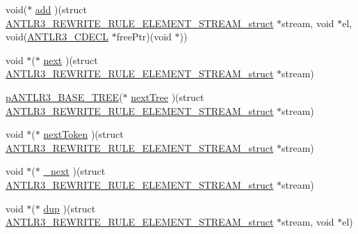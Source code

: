 \begin{DoxyCompactItemize}
\item 
void($\ast$ \hyperlink{struct_a_n_t_l_r3___r_e_w_r_i_t_e___r_u_l_e___e_l_e_m_e_n_t___s_t_r_e_a_m__struct_a40c0438d249bc834876cdeba57e5c36f}{add} )(struct \hyperlink{struct_a_n_t_l_r3___r_e_w_r_i_t_e___r_u_l_e___e_l_e_m_e_n_t___s_t_r_e_a_m__struct}{A\-N\-T\-L\-R3\-\_\-\-R\-E\-W\-R\-I\-T\-E\-\_\-\-R\-U\-L\-E\-\_\-\-E\-L\-E\-M\-E\-N\-T\-\_\-\-S\-T\-R\-E\-A\-M\-\_\-struct} $\ast$stream, void $\ast$el, void(\hyperlink{antlr3defs_8h_a91c919dd260a95cc88a0cd9b5c0a11cc}{A\-N\-T\-L\-R3\-\_\-\-C\-D\-E\-C\-L} $\ast$free\-Ptr)(void $\ast$))
\item 
void $\ast$($\ast$ \hyperlink{struct_a_n_t_l_r3___r_e_w_r_i_t_e___r_u_l_e___e_l_e_m_e_n_t___s_t_r_e_a_m__struct_a49a3d89cea69ba728843b12a5cfd51e3}{next} )(struct \hyperlink{struct_a_n_t_l_r3___r_e_w_r_i_t_e___r_u_l_e___e_l_e_m_e_n_t___s_t_r_e_a_m__struct}{A\-N\-T\-L\-R3\-\_\-\-R\-E\-W\-R\-I\-T\-E\-\_\-\-R\-U\-L\-E\-\_\-\-E\-L\-E\-M\-E\-N\-T\-\_\-\-S\-T\-R\-E\-A\-M\-\_\-struct} $\ast$stream)
\item 
\hyperlink{antlr3interfaces_8h_a6313a8a3e8f044398a393bd10c083852}{p\-A\-N\-T\-L\-R3\-\_\-\-B\-A\-S\-E\-\_\-\-T\-R\-E\-E}($\ast$ \hyperlink{struct_a_n_t_l_r3___r_e_w_r_i_t_e___r_u_l_e___e_l_e_m_e_n_t___s_t_r_e_a_m__struct_acb290228de319c4cf0a219a0a413069b}{next\-Tree} )(struct \hyperlink{struct_a_n_t_l_r3___r_e_w_r_i_t_e___r_u_l_e___e_l_e_m_e_n_t___s_t_r_e_a_m__struct}{A\-N\-T\-L\-R3\-\_\-\-R\-E\-W\-R\-I\-T\-E\-\_\-\-R\-U\-L\-E\-\_\-\-E\-L\-E\-M\-E\-N\-T\-\_\-\-S\-T\-R\-E\-A\-M\-\_\-struct} $\ast$stream)
\item 
void $\ast$($\ast$ \hyperlink{struct_a_n_t_l_r3___r_e_w_r_i_t_e___r_u_l_e___e_l_e_m_e_n_t___s_t_r_e_a_m__struct_ae68722ecc1e063575e357f87959f23a7}{next\-Token} )(struct \hyperlink{struct_a_n_t_l_r3___r_e_w_r_i_t_e___r_u_l_e___e_l_e_m_e_n_t___s_t_r_e_a_m__struct}{A\-N\-T\-L\-R3\-\_\-\-R\-E\-W\-R\-I\-T\-E\-\_\-\-R\-U\-L\-E\-\_\-\-E\-L\-E\-M\-E\-N\-T\-\_\-\-S\-T\-R\-E\-A\-M\-\_\-struct} $\ast$stream)
\item 
void $\ast$($\ast$ \hyperlink{struct_a_n_t_l_r3___r_e_w_r_i_t_e___r_u_l_e___e_l_e_m_e_n_t___s_t_r_e_a_m__struct_a69cee716e8e1deb6aa763737c5181544}{\-\_\-next} )(struct \hyperlink{struct_a_n_t_l_r3___r_e_w_r_i_t_e___r_u_l_e___e_l_e_m_e_n_t___s_t_r_e_a_m__struct}{A\-N\-T\-L\-R3\-\_\-\-R\-E\-W\-R\-I\-T\-E\-\_\-\-R\-U\-L\-E\-\_\-\-E\-L\-E\-M\-E\-N\-T\-\_\-\-S\-T\-R\-E\-A\-M\-\_\-struct} $\ast$stream)
\item 
void $\ast$($\ast$ \hyperlink{struct_a_n_t_l_r3___r_e_w_r_i_t_e___r_u_l_e___e_l_e_m_e_n_t___s_t_r_e_a_m__struct_ae843a201581e7ef94e8c50630a76eaf5}{dup} )(struct \hyperlink{struct_a_n_t_l_r3___r_e_w_r_i_t_e___r_u_l_e___e_l_e_m_e_n_t___s_t_r_e_a_m__struct}{A\-N\-T\-L\-R3\-\_\-\-R\-E\-W\-R\-I\-T\-E\-\_\-\-R\-U\-L\-E\-\_\-\-E\-L\-E\-M\-E\-N\-T\-\_\-\-S\-T\-R\-E\-A\-M\-\_\-struct} $\ast$stream, void $\ast$el)

\end{DoxyCompactItemize}
